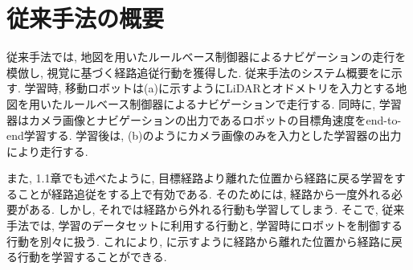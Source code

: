 
\section{従来手法の概要}
従来手法\cite{okada-si2020}では, 地図を用いたルールベース制御器によるナビゲーションの走行を模倣し, 視覚に基づく経路追従行動を獲得した. 従来手法のシステム概要をに示す. 学習時, 移動ロボットは(a)に示すようにLiDARとオドメトリを入力とする地図を用いたルールベース制御器によるナビゲーションで走行する. 同時に, 学習器はカメラ画像とナビゲーションの出力であるロボットの目標角速度をend-to-end学習する. 学習後は, (b)のようにカメラ画像のみを入力とした学習器の出力により走行する. \par また, 1.1章でも述べたように, 目標経路より離れた位置から経路に戻る学習をすることが経路追従をする上で有効である. そのためには, 経路から一度外れる必要がある. しかし, それでは経路から外れる行動も学習してしまう. そこで, 従来手法では, 学習のデータセットに利用する行動と, 学習時にロボットを制御する行動を別々に扱う. これにより, に示すように経路から離れた位置から経路に戻る行動を学習することができる. 


